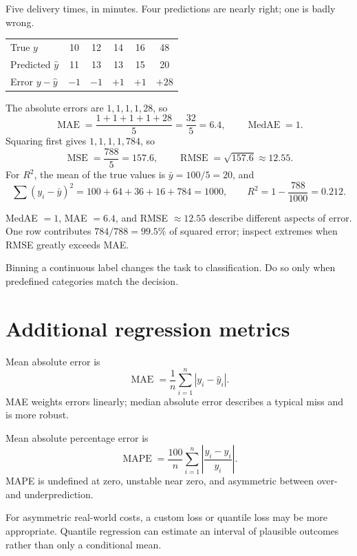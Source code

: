 \begin{workedexample}
Five delivery times, in minutes. Four predictions are nearly right; one is badly wrong.

\begin{mltable}\small
\begin{tabular}{lccccc}
\toprule
\rowcolor{MLPaleBlue!92}
True $y$            & 10 & 12 & 14 & 16 & 48 \\
Predicted $\hat{y}$ & 11 & 13 & 13 & 15 & 20 \\
Error $y-\hat{y}$   & $-1$ & $-1$ & $+1$ & $+1$ & $+28$ \\
\bottomrule
\end{tabular}
\end{mltable}

The absolute errors are $1,1,1,1,28$, so
\[
  \operatorname{MAE}=\frac{1+1+1+1+28}{5}=\frac{32}{5}=6.4,
  \qquad
  \operatorname{MedAE}=1.
\]
Squaring first gives $1,1,1,1,784$, so
\[
  \operatorname{MSE}=\frac{788}{5}=157.6,
  \qquad
  \operatorname{RMSE}=\sqrt{157.6}\approx 12.55.
\]
For $R^2$, the mean of the true values is $\bar{y}=100/5=20$, and
\[
  \sum{(y_i-\bar{y})}^2=100+64+36+16+784=1000,
  \qquad
  R^2=1-\frac{788}{1000}=0.212.
\]

MedAE $=1$, MAE $=6.4$, and RMSE $\approx12.55$ describe different aspects of error. One row contributes $784/788=99.5\%$ of squared error; inspect extremes when RMSE greatly exceeds MAE.
\end{workedexample}

\begin{pitfall}
Binning a continuous label changes the task to classification. Do so only when predefined categories match the decision.
\end{pitfall}

\section{Additional regression metrics}

Mean absolute error is
\[
  \operatorname{MAE}
  =\frac{1}{n}\sum_{i=1}^{n}|y_i-\hat{y}_i|.
\]
MAE weights errors linearly; median absolute error describes a typical miss and is more robust.

Mean absolute percentage error is
\[
  \operatorname{MAPE}
  =\frac{100}{n}\sum_{i=1}^{n}
  \left|\frac{y_i-\hat{y}_i}{y_i}\right|.
\]
MAPE is undefined at zero, unstable near zero, and asymmetric between over- and underprediction.

For asymmetric real-world costs, a custom loss or quantile loss may be more appropriate. Quantile regression can estimate an interval of plausible outcomes rather than only a conditional mean.

